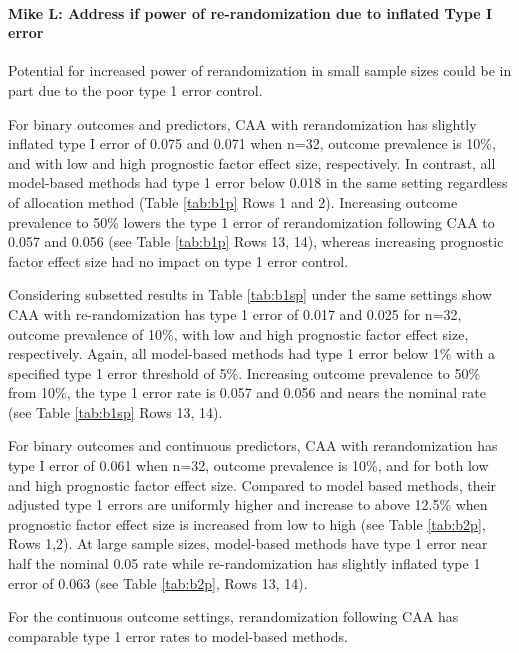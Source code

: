 \paragraph{Mike L: Address if power of re-randomization due to inflated Type I error}
Potential for increased power of rerandomization in small sample sizes could be in part due to the poor type 1 error control.

For binary outcomes and predictors, CAA with rerandomization has slightly inflated type I error of 0.075 and 0.071 when n=32, outcome prevalence is 10\%, and with low and high prognostic factor effect size, respectively.
In contrast, all model-based methods had type 1 error below 0.018 in the same setting regardless of allocation method (Table \ref{tab:b1p} Rows 1 and 2).
Increasing outcome prevalence to 50\% lowers the type 1 error of rerandomization following CAA to 0.057 and 0.056 (see Table \ref{tab:b1p} Rows 13, 14), whereas increasing prognostic factor effect size had no impact on type 1 error control.

Considering subsetted results in Table \ref{tab:b1sp} under the same settings show CAA with re-randomization has type 1 error of 0.017 and 0.025 for n=32, outcome prevalence of 10\%, with low and high prognostic factor effect size, respectively.
Again, all model-based methods had type 1 error below 1\% with a specified type 1 error threshold of 5\%.
Increasing outcome prevalence to 50\% from 10\%, the type 1 error rate is 0.057 and 0.056 and nears the nominal rate (see Table \ref{tab:b1sp} Rows 13, 14).

For binary outcomes and continuous predictors, CAA with rerandomization has type I error of 0.061 when n=32, outcome prevalence is 10\%, and for both low and high prognostic factor effect size.
Compared to model based methods, their adjusted type 1 errors are uniformly higher and increase to above 12.5\% when prognostic factor effect size is increased from low to high (see Table \ref{tab:b2p}, Rows 1,2).
At large sample sizes, model-based methods have type 1 error near half the nominal 0.05 rate while re-randomization has slightly inflated type 1 error of 0.063 (see Table \ref{tab:b2p}, Rows 13, 14).

For the continuous outcome settings, rerandomization following CAA has comparable type 1 error rates to model-based methods.


